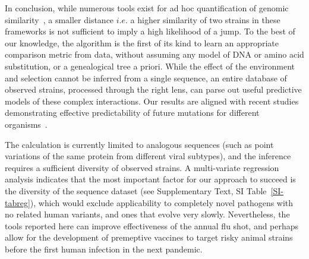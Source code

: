 \documentclass[onecolumn, compsoc,10pt]{IEEEtran}
\begin{document}
In conclusion, while numerous tools exist for ad hoc quantification of genomic similarity~\cite{posada1998modeltest,goldberger2005genomic,huelsenbeck1997phylogeny,neher2014predicting,VanderMeer2010,Smith2009}, a smaller  distance $i.e.$ a higher similarity of two strains in  these frameworks is not sufficient to imply a high likelihood of a jump. %
To the best of our knowledge, the \enet algorithm is  the first of its kind to learn an appropriate comparison metric from data, without assuming any model of DNA or amino acid substitution, or a genealogical tree a priori. While the effect of the environment and selection cannot be inferred from a single sequence, an entire database of observed strains, processed through the right lens, can parse out useful predictive models of these complex interactions. Our results are  aligned with recent studies demonstrating effective  predictability of  future mutations  for different organisms~\cite{mollentze2021identifying,maher2021predicting}.
   
The \qdist calculation   is currently limited to analogous sequences (such as point variations of the same protein from different viral subtypes), and the \enet inference requires a  sufficient diversity of observed strains. A multi-variate regression analysis indicates  that the most important factor for our approach to succeed is  the diversity of the sequence dataset (see Supplementary Text, SI Table~\ref{SI-tabreg}), which would exclude applicability to completely novel pathogens with no related human variants, and ones that evolve very slowly. Nevertheless, the tools reported here can improve effectiveness of the annual flu shot, and perhaps allow for the development of premeptive vaccines to  target risky animal strains  before the first human infection in the next pandemic.
\end{document}
